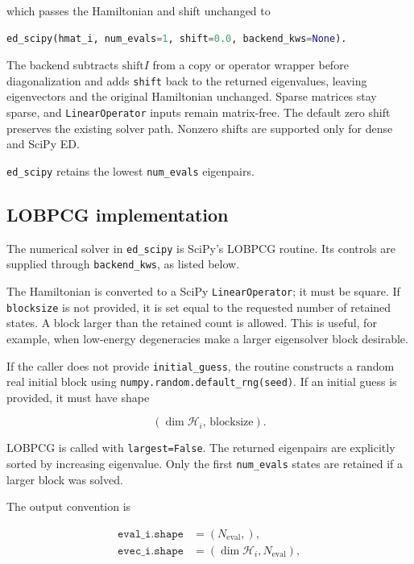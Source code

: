 \documentclass[11pt]{article}
\begin{document}
which passes the Hamiltonian and shift unchanged to

\begin{lstlisting}[language=Python]
ed_scipy(hmat_i, num_evals=1, shift=0.0, backend_kws=None).
\end{lstlisting}

The backend subtracts \(\mathrm{shift} I\) from a copy or operator wrapper before diagonalization and adds \texttt{shift} back to the returned eigenvalues, leaving eigenvectors and the original Hamiltonian unchanged. Sparse matrices stay sparse, and \texttt{LinearOperator} inputs remain matrix-free. The default zero shift preserves the existing solver path. Nonzero shifts are supported only for dense and SciPy ED.

\texttt{ed\_scipy} retains the lowest \texttt{num\_evals} eigenpairs.

\subsection{LOBPCG implementation}

The numerical solver in \texttt{ed\_scipy} is SciPy's LOBPCG routine. Its controls are supplied through \texttt{backend\_kws}, as listed below.

The Hamiltonian is converted to a SciPy \texttt{LinearOperator}; it must be square.  If \texttt{blocksize} is not provided, it is set equal to the requested number of retained states.  A block larger than the retained count is allowed.  This is useful, for example, when low-energy degeneracies make a larger eigensolver block desirable.

If the caller does not provide \texttt{initial\_guess}, the routine constructs a random real initial block using \texttt{numpy.random.default\_rng(seed)}.  If an initial guess is provided, it must have shape

\begin{equation}
  (\dim\mathcal H_i,\,\mathrm{blocksize}).
\end{equation}

LOBPCG is called with \texttt{largest=False}.  The returned eigenpairs are explicitly sorted by increasing eigenvalue.  Only the first \texttt{num\_evals} states are retained if a larger block was solved.

The output convention is

\begin{align}
  \texttt{eval\_i.shape} &= (N_{\mathrm{eval}},),\\
  \texttt{evec\_i.shape} &= (\dim\mathcal H_i,N_{\mathrm{eval}}),
\end{align}
\end{document}
